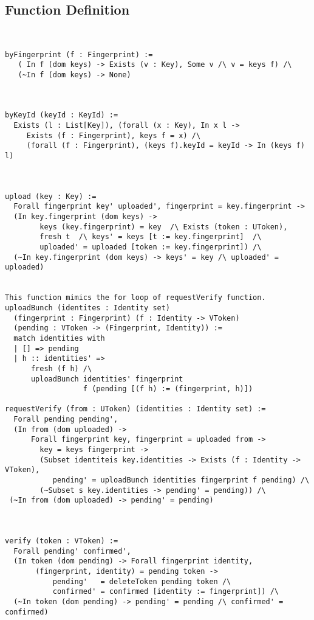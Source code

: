 \documentclass{article}
\begin{document}
\subsection{Function Definition}
\begin{verbatim}


byFingerprint (f : Fingerprint) := 
   ( In f (dom keys) -> Exists (v : Key), Some v /\ v = keys f) /\ 
   (~In f (dom keys) -> None) 
 


byKeyId (keyId : KeyId) :=
  Exists (l : List[Key]), (forall (x : Key), In x l -> 
     Exists (f : Fingerprint), keys f = x) /\
     (forall (f : Fingerprint), (keys f).keyId = keyId -> In (keys f) l)
      


upload (key : Key) := 
  Forall fingerprint key' uploaded', fingerprint = key.fingerprint -> 
  (In key.fingerprint (dom keys) -> 
        keys (key.fingerprint) = key  /\ Exists (token : UToken), 
        fresh t  /\ keys' = keys [t := key.fingerprint]  /\
        uploaded' = uploaded [token := key.fingerprint]) /\
  (~In key.fingerprint (dom keys) -> keys' = key /\ uploaded' = uploaded)  
         
              
This function mimics the for loop of requestVerify function.
uploadBunch (identites : Identity set) 
  (fingerprint : Fingerprint) (f : Identity -> VToken)  
  (pending : VToken -> (Fingerprint, Identity)) := 
  match identities with
  | [] => pending
  | h :: identities' => 
      fresh (f h) /\ 
      uploadBunch identities' fingerprint 
                  f (pending [(f h) := (fingerprint, h)])

requestVerify (from : UToken) (identities : Identity set) := 
  Forall pending pending',
  (In from (dom uploaded) -> 
      Forall fingerprint key, fingerprint = uploaded from -> 
        key = keys fingerprint -> 
        (Subset identiteis key.identities -> Exists (f : Identity -> VToken), 
           pending' = uploadBunch identities fingerprint f pending) /\
        (~Subset s key.identities -> pending' = pending)) /\
 (~In from (dom uploaded) -> pending' = pending)



verify (token : VToken) := 
  Forall pending' confirmed', 
  (In token (dom pending) -> Forall fingerprint identity,
       (fingerprint, identity) = pending token -> 
           pending'   = deleteToken pending token /\        
           confirmed' = confirmed [identity := fingerprint]) /\
  (~In token (dom pending) -> pending' = pending /\ confirmed' = confirmed)



\end{verbatim}
\end{document}
